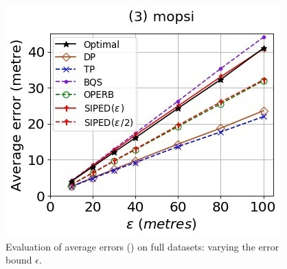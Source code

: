 \begin{figure}[tb!]
	\includegraphics[scale=0.500]{Figures/Exp-PED-error-epsilon-mopsi.jpg}	
	\vspace{-2ex}
	\caption{\small Evaluation of average errors (\ped) on full datasets: varying the error bound $\epsilon$.}
	\label{fig:ae-ped-epsilon}
	\vspace{-2ex}
\end{figure}

